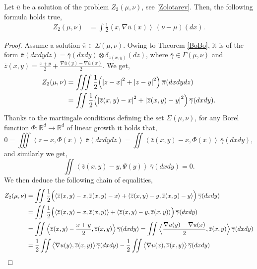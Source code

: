 \documentclass[10pt,a4paper]{amsart}
\newcommand{\Rd}{{\R^d}}
\newcommand{\R}{\mathbb{R}}
\newcommand{\abs}[1]{{\left \lvert #1 \right \rvert}}
\newcommand{\ov}{\overline}
\newcommand{\pairing}[1]{{\left \langle #1 \right \rangle}}
\begin{document}
\begin{lemma}
    \label{magic_formula}
    Let $\ov{u}$ be a solution of the problem $Z_2(\mu,\nu)$, see \eqref{Zolotarev}. Then, the following formula holds true,
    \begin{align}\label{magic=}
        Z_2(\mu,\nu) &= \int \frac{1}{2} \pairing{x,\nabla \ov{u}(x)} \, (\nu-\mu)(dx).
    \end{align}
\end{lemma}

\begin{proof}
    Assume a solution $\ov{\pi} \in \Sigma(\mu,\nu)$. Owing to Theorem  \ref{BoBo}, it is of the form $\ov{\pi}(dxdydz) = \ov\gamma(dxdy) \otimes \delta_{\ov{z}(x,y)}(dz)$, where $\ov\gamma \in \Gamma(\mu,\nu)$ and $\ov{z}(x,y) = \frac{x+y}{2} + \frac{\nabla \ov u(y)-\nabla \ov u(x)}{2}$. We get,
    \begin{align}
        Z_2(\mu,\nu) &= \iiint \frac{1}{2} \Bigl( \abs{z-x}^2 + \abs{z-y}^2 \Bigr) \, \ov\pi(dxdydz)  \\
        & = \iint \frac{1}{2} \Bigl( \abs{\ov{z}(x,y)-x}^2 + \abs{\ov{z}(x,y)-y}^2 \Bigr) \, \ov\gamma(dxdy).
    \end{align}
    Thanks to the martingale conditions defining the set $\Sigma(\mu,\nu)$, for any Borel function $\Phi:\Rd \to \Rd$ of linear growth it holds that,
    \begin{equation} \label{mart1}
        0 = \iiint  \pairing{z-x,\Phi(x)} \, \ov\pi(dxdydz) = \iint  \pairing{\ov{z}(x,y)-x,\Phi(x)} \, \ov\gamma(dxdy),
    \end{equation}
    and similarly we get,
    \begin{equation} \label{mart2}
       \iint  \pairing{\ov{z}(x,y)-y,\Psi(y)} \, \ov\gamma(dxdy)=0.
    \end{equation}
  We then deduce the following chain of equalities,
    \begin{align*}
    	Z_2(\mu,\nu) & =  \iint \frac{1}{2} \Bigl( \pairing{\ov{z}(x,y)-x,\ov{z}(x,y)-x} + \pairing{\ov{z}(x,y)-y,\ov{z}(x,y)-y} \Bigr) \, \ov\gamma(dxdy) \\
    	& =  \iint \frac{1}{2} \Bigl( \pairing{\ov{z}(x,y)-x,\ov{z}(x,y)} + \pairing{\ov{z}(x,y)-y,\ov{z}(x,y)} \Bigr) \, \ov\gamma(dxdy) \\
    	&= \iint \Big\langle \ov{z}(x,y) - \frac{x+y}{2}, \ov{z}(x,y) \Big\rangle  \, \ov\gamma(dxdy) = \iint \Big\langle \frac{ \nabla u(y) - \nabla u(x)}{2}, \ov{z}(x,y) \Big\rangle  \, \ov\gamma(dxdy) \\
    	& = \frac{1}{2 } \iint \big\langle \nabla u(y), \ov{z}(x,y) \big\rangle  \, \ov\gamma(dxdy)  - \frac{1}{2 } \iint \big\langle \nabla u(x), \ov{z}(x,y) \big\rangle  \, \ov\gamma(dxdy) \\

\end{align*}
\end{proof}
\end{document}
